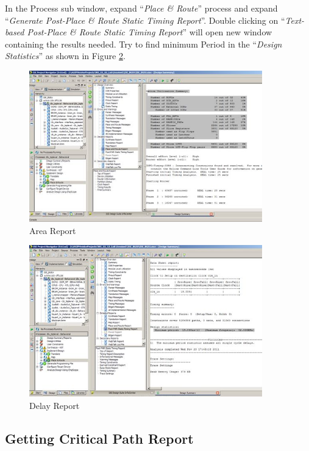 In the Process sub window, expand ``\emph{Place \& Route}'' process and
expand ``\emph{Generate Post-Place \& Route Static Timing Report}''.
Double clicking on ``\emph{Text-based Post-Place \& Route Static Timing
Report}'' will open new window containing the results needed. Try to
find minimum Period in the ``\emph{Design Statistics}'' as shown in
Figure \ref{fig:fig611}.
\begin{figure}[!htb]
	\centering
	\includegraphics[width=0.9\textwidth]{src/images/6-10.png}
	\caption{Area Report}
	\label{fig:fig610}
\end{figure}
\begin{figure}[!htb]
	\centering
	\includegraphics[width=0.9\textwidth]{src/images/6-11.png}
	\caption{Delay Report}
	\label{fig:fig611}
\end{figure}
\hypertarget{getting-critical-path-report}{%
\subsection{Getting Critical Path
Report}\label{getting-critical-path-report}}

